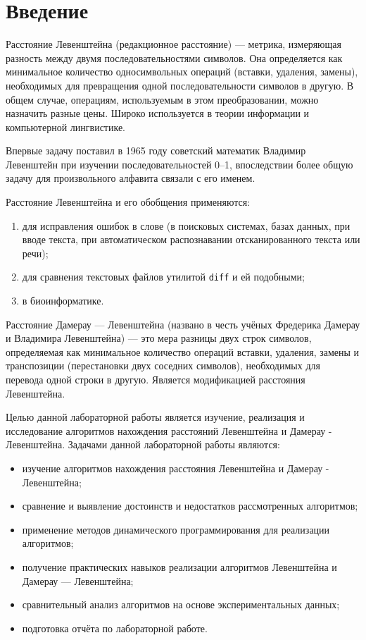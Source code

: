 \documentclass[a4paper,14pt, unknownkeysallowed]{extreport}
\newcommand{\code}[1]{\texttt{#1}}
\begin{document}
\tableofcontents

\chapter*{Введение}

Расстояние Левенштейна (редакционное расстояние) — метрика, измеряющая разность между двумя последовательностями символов. Она определяется как минимальное количество односимвольных операций (вставки, удаления, замены), необходимых для превращения одной последовательности символов в другую. В общем случае, операциям, используемым в этом преобразовании, можно назначить разные цены. Широко используется в теории информации и компьютерной лингвистике.

Впервые задачу поставил в 1965 году советский математик Владимир Левенштейн при изучении последовательностей 0--1, впоследствии более общую задачу для произвольного алфавита связали с его именем.

Расстояние Левенштейна и его обобщения применяются: 
\begin{enumerate}
	\item для исправления ошибок в слове (в поисковых системах, базах данных, при вводе текста, при автоматическом распознавании отсканированного текста или речи);
	\item для сравнения текстовых файлов утилитой \code{diff} и ей подобными;
	\item в биоинформатике.
\end{enumerate}

Расстояние Дамерау — Левенштейна (названо в честь учёных Фредерика Дамерау и Владимира Левенштейна) — это мера разницы двух строк символов, определяемая как минимальное количество операций вставки, удаления, замены и транспозиции (перестановки двух соседних символов), необходимых для перевода одной строки в другую. Является модификацией расстояния Левенштейна.

Целью данной лабораторной работы является изучение, реализация и исследование алгоритмов нахождения расстояний Левенштейна и Дамерау - Левенштейна. Задачами данной лабораторной работы являются:
\begin{itemize}
    \item изучение алгоритмов нахождения расстояния Левенштейна и Дамерау - Левенштейна;
    \item сравнение и выявление достоинств и недостатков рассмотренных алгоритмов;
	\item применение методов динамического программирования для реализации алгоритмов;
	\item получение практических навыков реализации алгоритмов Левенштейна и Дамерау — Левенштейна;
	\item сравнительный анализ алгоритмов на основе экспериментальных данных;
	\item подготовка отчёта по лабораторной работе.
\end{itemize}
\end{document}
